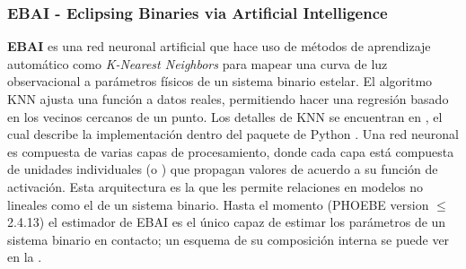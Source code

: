 \subsubsection{EBAI - Eclipsing Binaries via Artificial Intelligence}
\textbf{EBAI} es una red neuronal artificial que hace uso de métodos de
aprendizaje automático como \textit{K-Nearest Neighbors} para mapear una curva
de luz observacional a parámetros físicos de un sistema binario estelar. El
algoritmo KNN ajusta una función a datos reales, permitiendo hacer una regresión
basado en los vecinos cercanos de un punto. Los detalles de KNN se encuentran en
, el cual describe la implementación
dentro del paquete de Python . Una red neuronal es compuesta
de varias capas de procesamiento, donde cada capa está compuesta de unidades
individuales (o ) que propagan valores de acuerdo a su función
de activación. Esta arquitectura es la que les permite 
relaciones en modelos no lineales como el de un sistema binario. Hasta el
momento (PHOEBE version $\leq$2.4.13) el estimador de EBAI es el único capaz de
estimar los parámetros de un sistema binario en contacto; un esquema de su
composición interna se puede ver en la .


